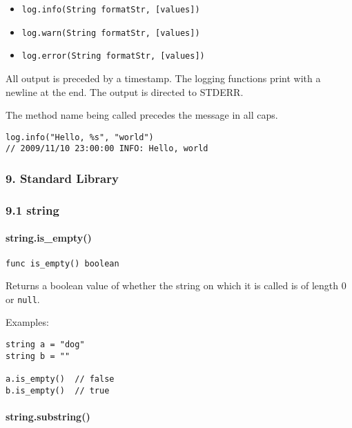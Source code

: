 \begin{itemize}
\itemsep1pt\parskip0pt
\item
  \texttt{log.info(String formatStr, {[}values{]})}
\item
  \texttt{log.warn(String formatStr, {[}values{]})}
\item
  \texttt{log.error(String formatStr, {[}values{]})}
\end{itemize}

All output is preceded by a timestamp. The logging functions print with
a newline at the end. The output is directed to STDERR.

The method name being called precedes the message in all caps.

\begin{verbatim}
log.info("Hello, %s", "world")
// 2009/11/10 23:00:00 INFO: Hello, world
\end{verbatim}

\subsubsection{9. Standard Library}\label{standard-library}

\subsubsection{9.1 string}\label{string}

\paragraph{string.is\_empty()}\label{string.isux5fempty}

\begin{verbatim}
func is_empty() boolean
\end{verbatim}

Returns a boolean value of whether the string on which it is called is
of length 0 or \texttt{null}.

Examples:

\begin{verbatim}
string a = "dog"
string b = ""

a.is_empty()  // false
b.is_empty()  // true
\end{verbatim}

\paragraph{string.substring()}\label{string.substring}

